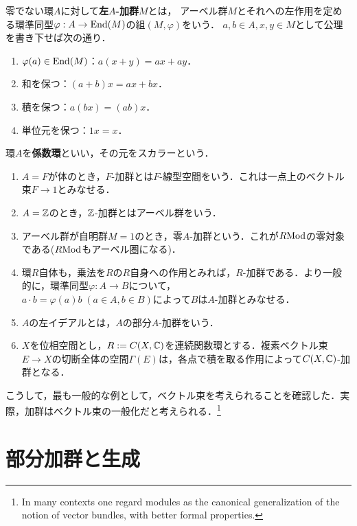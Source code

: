 \documentclass[uplatex,dvipdfmx]{jsreport}
\begin{document}
\begin{definition}
    零でない環$A$に対して\textbf{左$A$-加群}$M$とは，
    アーベル群$M$とそれへの左作用を定める環準同型$\varphi:A\to\mathrm{End}(M)$の組$(M,\varphi)$をいう．
    $a,b\in A,x,y\in M$として公理を書き下せば次の通り．
    \begin{enumerate}
        \item $\varphi(a)\in\mathrm{End}(M)$：$a(x+y)=ax+ay$．
        \item 和を保つ：$(a+b)x=ax+bx$．
        \item 積を保つ：$a(bx)=(ab)x$．
        \item 単位元を保つ：$1x=x$．
    \end{enumerate}
    環$A$を\textbf{係数環}といい，その元をスカラーという．
\end{definition}
\begin{example}\mbox{}
    \begin{enumerate}
        \item $A=F$が体のとき，$F$-加群とは$F$-線型空間をいう．これは一点上のベクトル束$F\to1$とみなせる．
        \item $A=\mathbb{Z}$のとき，$\mathbb{Z}$-加群とはアーベル群をいう．
        \item アーベル群が自明群$M=1$のとき，零$A$-加群という．これが$R\mathrm{Mod}$の零対象である($R\mathrm{Mod}$もアーベル圏になる)．
        \item 環$R$自体も，乗法を$R$の$R$自身への作用とみれば，$R$-加群である．より一般的に，環準同型$\varphi:A\to B$について，\\
        $a\cdot b=\varphi(a)b\;(a\in A,b\in B)$によって$B$は$A$-加群とみなせる．
        \item $A$の左イデアルとは，$A$の部分$A$-加群をいう．
        \item $X$を位相空間とし，$R:=C(X,\mathbb{C})$を連続関数環とする．複素ベクトル束$E\to X$の切断全体の空間$\Gamma(E)$は，各点で積を取る作用によって$C(X,\mathbb{C})$-加群となる．
    \end{enumerate}
\end{example}
\begin{remarks}
    こうして，最も一般的な例として，ベクトル束を考えられることを確認した．実際，加群はベクトル束の一般化だと考えられる．\footnote{In many contexts one regard modules as the canonical generalization of the notion of vector bundles, with better formal properties.}
\end{remarks}

\section{部分加群と生成}
\end{document}
